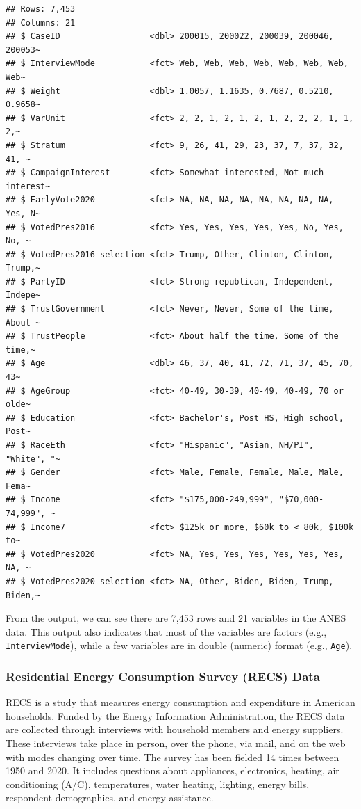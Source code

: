 \documentclass[
]{krantz}
\begin{document}
\begin{verbatim}
## Rows: 7,453
## Columns: 21
## $ CaseID                  <dbl> 200015, 200022, 200039, 200046, 200053~
## $ InterviewMode           <fct> Web, Web, Web, Web, Web, Web, Web, Web~
## $ Weight                  <dbl> 1.0057, 1.1635, 0.7687, 0.5210, 0.9658~
## $ VarUnit                 <fct> 2, 2, 1, 2, 1, 2, 1, 2, 2, 2, 1, 1, 2,~
## $ Stratum                 <fct> 9, 26, 41, 29, 23, 37, 7, 37, 32, 41, ~
## $ CampaignInterest        <fct> Somewhat interested, Not much interest~
## $ EarlyVote2020           <fct> NA, NA, NA, NA, NA, NA, NA, NA, Yes, N~
## $ VotedPres2016           <fct> Yes, Yes, Yes, Yes, Yes, No, Yes, No, ~
## $ VotedPres2016_selection <fct> Trump, Other, Clinton, Clinton, Trump,~
## $ PartyID                 <fct> Strong republican, Independent, Indepe~
## $ TrustGovernment         <fct> Never, Never, Some of the time, About ~
## $ TrustPeople             <fct> About half the time, Some of the time,~
## $ Age                     <dbl> 46, 37, 40, 41, 72, 71, 37, 45, 70, 43~
## $ AgeGroup                <fct> 40-49, 30-39, 40-49, 40-49, 70 or olde~
## $ Education               <fct> Bachelor's, Post HS, High school, Post~
## $ RaceEth                 <fct> "Hispanic", "Asian, NH/PI", "White", "~
## $ Gender                  <fct> Male, Female, Female, Male, Male, Fema~
## $ Income                  <fct> "$175,000-249,999", "$70,000-74,999", ~
## $ Income7                 <fct> $125k or more, $60k to < 80k, $100k to~
## $ VotedPres2020           <fct> NA, Yes, Yes, Yes, Yes, Yes, Yes, NA, ~
## $ VotedPres2020_selection <fct> NA, Other, Biden, Biden, Trump, Biden,~
\end{verbatim}

From the output, we can see there are 7,453 rows and 21 variables in the ANES data. This output also indicates that most of the variables are factors (e.g., \texttt{InterviewMode}), while a few variables are in double (numeric) format (e.g., \texttt{Age}).

\hypertarget{residential-energy-consumption-survey-recs-data}{%
\subsubsection*{Residential Energy Consumption Survey (RECS) Data}\label{residential-energy-consumption-survey-recs-data}}


RECS is a study that measures energy consumption and expenditure in American households. Funded by the Energy Information Administration, the RECS data are collected through interviews with household members and energy suppliers. These interviews take place in person, over the phone, via mail, and on the web with modes changing over time. The survey has been fielded 14 times between 1950 and 2020. It includes questions about appliances, electronics, heating, air conditioning (A/C), temperatures, water heating, lighting, energy bills, respondent demographics, and energy assistance.
\end{document}
